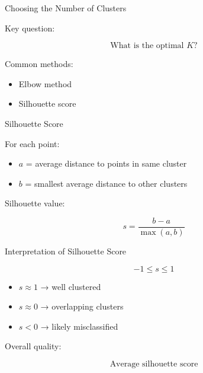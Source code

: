 \documentclass{beamer}
\begin{document}
\begin{frame}{Choosing the Number of Clusters}

Key question:

\[
\text{What is the optimal } K?
\]

\vspace{0.5cm}

Common methods:

\begin{itemize}
    \item Elbow method
    \item Silhouette score
\end{itemize}

\end{frame}

\begin{frame}{Silhouette Score}

For each point:

\begin{itemize}
    \item $a$ = average distance to points in same cluster
    \item $b$ = smallest average distance to other clusters
\end{itemize}

\vspace{0.5cm}

Silhouette value:

\[
s = \frac{b - a}{\max(a, b)}
\]

\end{frame}

\begin{frame}{Interpretation of Silhouette Score}

\[
-1 \leq s \leq 1
\]

\vspace{0.5cm}

\begin{itemize}
    \item $s \approx 1$ → well clustered
    \item $s \approx 0$ → overlapping clusters
    \item $s < 0$ → likely misclassified
\end{itemize}

\vspace{0.5cm}

Overall quality:

\[
\text{Average silhouette score}
\]

\end{frame}
\end{document}
